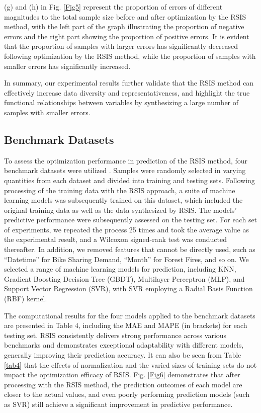 \documentclass[final,3p,times]{elsarticle}
\begin{document}
(g) and (h) in Fig. \ref{Fig5} represent the proportion of errors 
of different magnitudes to the total sample size before and after 
optimization by the RSIS method, with the left part of the graph 
illustrating the proportion of negative errors and the right part 
showing the proportion of positive errors. It is evident that the 
proportion of samples with larger errors has significantly 
decreased following optimization by the RSIS method, while the 
proportion of samples with smaller errors has significantly 
increased. 

{In summary, our experimental results further validate that the RSIS method can effectively increase data diversity and representativeness, and highlight the true functional relationships between variables by synthesizing a large number of samples with smaller errors.}


\subsection{Benchmark Datasets}
To assess the optimization performance in prediction of the RSIS 
method, four benchmark datasets were utilized \cite{bib84,bib85,bib86,bib87}. Samples 
were randomly selected in varying quantities from each dataset 
and divided into training and testing sets. Following 
processing of the training data with the RSIS approach, a 
suite of machine learning models was subsequently trained on 
this dataset,
{which included the original training data as well as the data synthesized by RSIS.}
 The models' predictive performance were subsequently 
assessed on the testing set. For each set of experiments, we 
repeated the process 25 times and took the average value as the 
experimental result, and a Wilcoxon signed-rank test was 
conducted thereafter. In addition, we removed features that 
cannot be directly used, such as “Datetime” for Bike Sharing 
Demand, “Month” for Forest Fires, and so on. We selected a range 
of machine learning models for prediction, including KNN, 
Gradient Boosting Decision Tree (GBDT), Multilayer Perceptron 
(MLP), and Support Vector Regression (SVR), with SVR employing a 
Radial Basis Function (RBF) kernel. 



The computational results for the four models applied to the 
benchmark datasets are presented in Table 4, including the MAE 
and MAPE (in brackets) for each testing set. RSIS consistently 
delivers strong performance across various benchmarks and 
demonstrates exceptional adaptability with different models, 
generally improving their prediction accuracy. It can also be 
seen from Table \ref{tab4} that the effects of normalization 
and the varied sizes of training sets do not impact the 
optimization efficacy of RSIS. Fig. \ref{Fig6} demonstrates 
that after processing with the RSIS method, the prediction outcomes 
of each model are closer to the actual values, and even poorly 
performing prediction models (such as SVR) still achieve a 
significant improvement in predictive performance. 
\end{document}
